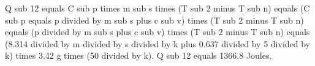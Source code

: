 Q sub 12 equals C sub p times m sub s times (T sub 2 minus T sub n) equals (C sub p equals p divided by m sub s plus c sub v) times (T sub 2 minus T sub n) equals (p divided by m sub s plus c sub v) times (T sub 2 minus T sub n) equals (8.314 divided by m divided by s divided by k plus 0.637 divided by 5 divided by k) times 3.42 g times (50 divided by k).  
Q sub 12 equals 1366.8 Joules.